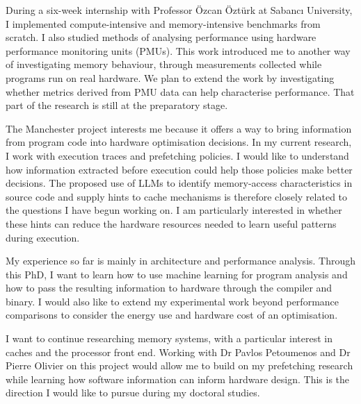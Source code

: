 \documentclass[11pt,a4paper]{article}
\begin{document}
During a six-week internship with Professor Özcan Öztürk at Sabancı University, I implemented compute-intensive and memory-intensive benchmarks from scratch. I also studied methods of analysing performance using hardware performance monitoring units (PMUs). This work introduced me to another way of investigating memory behaviour, through measurements collected while programs run on real hardware. We plan to extend the work by investigating whether metrics derived from PMU data can help characterise performance. That part of the research is still at the preparatory stage.

The Manchester project interests me because it offers a way to bring information from program code into hardware optimisation decisions. In my current research, I work with execution traces and prefetching policies. I would like to understand how information extracted before execution could help those policies make better decisions. The proposed use of LLMs to identify memory-access characteristics in source code and supply hints to cache mechanisms is therefore closely related to the questions I have begun working on. I am particularly interested in whether these hints can reduce the hardware resources needed to learn useful patterns during execution.

My experience so far is mainly in architecture and performance analysis. Through this PhD, I want to learn how to use machine learning for program analysis and how to pass the resulting information to hardware through the compiler and binary. I would also like to extend my experimental work beyond performance comparisons to consider the energy use and hardware cost of an optimisation.

I want to continue researching memory systems, with a particular interest in caches and the processor front end. Working with Dr Pavlos Petoumenos and Dr Pierre Olivier on this project would allow me to build on my prefetching research while learning how software information can inform hardware design. This is the direction I would like to pursue during my doctoral studies.
\end{document}
